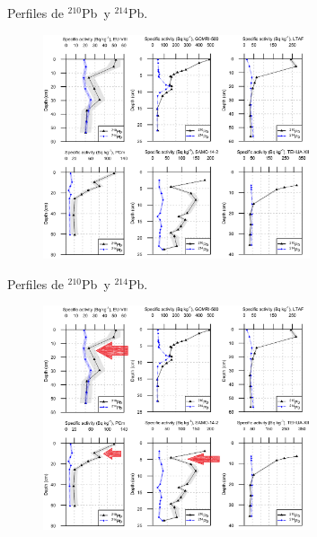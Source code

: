 \documentclass[9pt]{beamer}
\newcommand{\PbCero}{$^{210}$Pb}
\newcommand{\PbCuatro}{$^{214}$Pb}
\begin{document}
\begin{frame}{Perfiles de \PbCero\, y \PbCuatro.}
	\begin{figure}
		\centering 
		\includegraphics[width=0.7\textwidth]{Imagenes/Graficas_Perfiles_Todos_20190509-2.png}
	\end{figure}
	\begin{flushleft}
\hyperlink{Diagenesis}{} \hyperlink{Shape}{}
\end{flushleft}
\end{frame}

\begin{frame}[noframenumbering]{Perfiles de \PbCero\, y \PbCuatro.}
	\begin{figure}
		\centering 
		\includegraphics[width=0.7\textwidth]{Imagenes/Graficas_Perfiles_Todos_20190509-3.png}
	\end{figure}
	\begin{flushleft}
\hyperlink{Diagenesis}{} \hyperlink{Shape}{}
\end{flushleft}
\end{frame}
\end{document}
